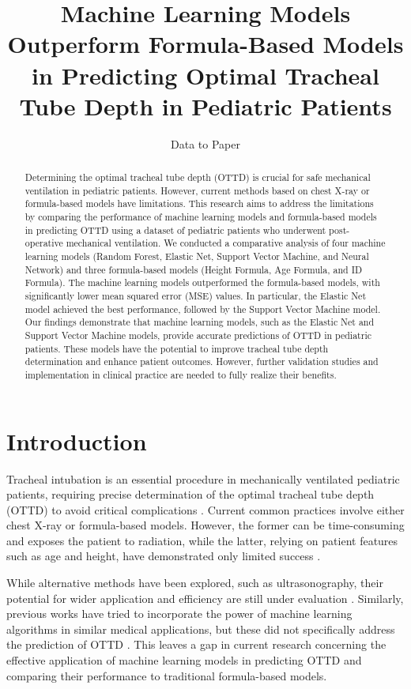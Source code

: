 \documentclass[11pt]{article}
\title{Machine Learning Models Outperform Formula-Based Models in Predicting Optimal Tracheal Tube Depth in Pediatric Patients}
\author{Data to Paper}
\begin{document}
\maketitle
\begin{abstract}
Determining the optimal tracheal tube depth (OTTD) is crucial for safe mechanical ventilation in pediatric patients. However, current methods based on chest X-ray or formula-based models have limitations. This research aims to address the limitations by comparing the performance of machine learning models and formula-based models in predicting OTTD using a dataset of pediatric patients who underwent post-operative mechanical ventilation. We conducted a comparative analysis of four machine learning models (Random Forest, Elastic Net, Support Vector Machine, and Neural Network) and three formula-based models (Height Formula, Age Formula, and ID Formula). The machine learning models outperformed the formula-based models, with significantly lower mean squared error (MSE) values. In particular, the Elastic Net model achieved the best performance, followed by the Support Vector Machine model. Our findings demonstrate that machine learning models, such as the Elastic Net and Support Vector Machine models, provide accurate predictions of OTTD in pediatric patients. These models have the potential to improve tracheal tube depth determination and enhance patient outcomes. However, further validation studies and implementation in clinical practice are needed to fully realize their benefits.
\end{abstract}
\section*{Introduction}

Tracheal intubation is an essential procedure in mechanically ventilated pediatric patients, requiring precise determination of the optimal tracheal tube depth (OTTD) to avoid critical complications \cite{Shibasaki2010PredictionOP}. Current common practices involve either chest X-ray or formula-based models. However, the former can be time-consuming and exposes the patient to radiation, while the latter, relying on patient features such as age and height, have demonstrated only limited success \cite{Shibasaki2010PredictionOP, Kerrey2009APC}.

While alternative methods have been explored, such as ultrasonography, their potential for wider application and efficiency are still under evaluation \cite{Shibasaki2010PredictionOP}. Similarly, previous works have tried to incorporate the power of machine learning algorithms in similar medical applications, but these did not specifically address the prediction of OTTD \cite{Pirani2022ACA, Fang2020ImproveIH}. This leaves a gap in current research concerning the effective application of machine learning models in predicting OTTD and comparing their performance to traditional formula-based models.
\end{document}
